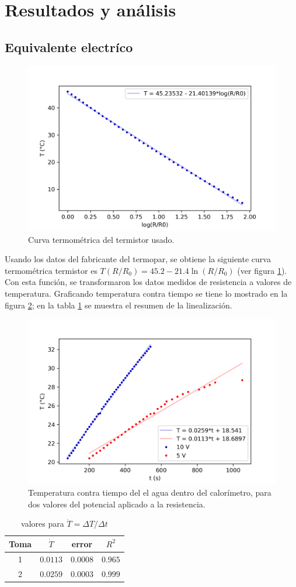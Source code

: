 \section{Resultados y análisis}
\subsection{Equivalente electríco}

\begin{figure}[h]
    \centering
    \includegraphics[width=0.35\linewidth]{img/termometric_curve.png}
    \caption{Curva termométrica del termistor usado.}
    \label{fig:termometric_curve}
\end{figure}

Usando los datos del fabricante del termopar, se obtiene la siguiente curva termométrica termistor es $T(R/R_0) = 45.2 - 21.4\ln(R/R_0)$ (ver figura \ref{fig:termometric_curve}). Con esta función, se transformaron los datos medidos de resistencia a valores de temperatura. Graficando temperatura contra tiempo se tiene lo mostrado en la figura \ref{fig:T_vs_t}; en la tabla \ref{tab:T_vs_t} se muestra el resumen de la linealización.

\begin{figure}[t]
    \centering
    \includegraphics[width=0.6\linewidth]{img/T_vs_t.png}
    \caption{Temperatura contra tiempo del el agua dentro del calorímetro, para dos valores del potencial aplicado a la resistencia.}
    \label{fig:T_vs_t}
\end{figure}

\begin{table}[h]
    \centering
    \begin{tabular}{cccc}
        \toprule
        Toma & $\dot T$ & error & $R^2$ \\
        \midrule
        1 & $0.0113$ & $0.0008$ & $0.965 $\\
        2 & $0.0259$ & $0.0003$ & $0.999 $\\
        \bottomrule
    \end{tabular}
    \caption{valores para $\dot T = \Delta T/\Delta t$}    
    \label{tab:T_vs_t}    
\end{table}



